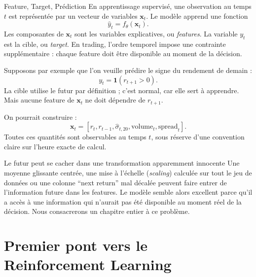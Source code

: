 \begin{recallbox}{Feature, Target, Prédiction}
En apprentissage supervisé, une observation au temps $t$ est représentée par un vecteur de variables $\mathbf{x}_t$. Le modèle apprend une fonction
\[
\widehat{y}_t=f_\theta(\mathbf{x}_t).
\]
Les composantes de $\mathbf{x}_t$ sont les variables explicatives, ou \emph{features}. La variable $y_t$ est la cible, ou \emph{target}. En trading, l'ordre temporel impose une contrainte supplémentaire : chaque feature doit être disponible au moment de la décision.
\end{recallbox}

Supposons par exemple que l'on veuille prédire le signe du rendement de demain :
\[
y_t=\mathbf{1}(r_{t+1}>0).
\]
La cible utilise le futur par définition ; c'est normal, car elle sert à apprendre. Mais aucune feature de $\mathbf{x}_t$ ne doit dépendre de $r_{t+1}$.

On pourrait construire :
\[
\mathbf{x}_t=
\left[
 r_t,
 r_{t-1},
 \widehat{\sigma}_{t,20},
 \text{volume}_t,
 \text{spread}_t
\right].
\]
Toutes ces quantités sont observables au temps $t$, sous réserve d'une convention claire sur l'heure exacte de calcul.

\begin{attentionbox}{Le futur peut se cacher dans une transformation apparemment innocente}
Une moyenne glissante centrée, une mise à l'échelle (\emph{scaling}) calculée sur tout le jeu de données ou une colonne ``next return'' mal décalée peuvent faire entrer de l'information future dans les features. Le modèle semble alors excellent parce qu'il a accès à une information qui n'aurait pas été disponible au moment réel de la décision. Nous consacrerons un chapitre entier à ce problème.
\end{attentionbox}

\section{Premier pont vers le Reinforcement Learning}

